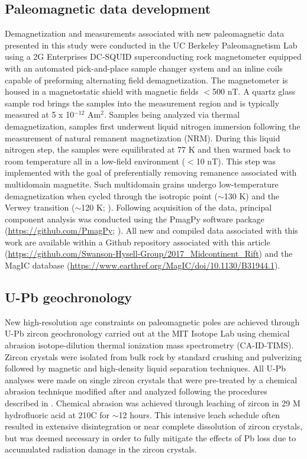 \documentclass[11pt,letterpaper]{article}
\begin{document}
\subsection{Paleomagnetic data development}

Demagnetization and measurements associated with new paleomagnetic data presented in this study were conducted in the UC Berkeley Paleomagnetism Lab using a 2G Enterprises DC-SQUID superconducting rock magnetometer equipped with an automated pick-and-place sample changer system and an inline coils capable of preforming alternating field demagnetization. The magnetometer is housed in a magnetostatic shield with magnetic fields $<$500 nT. A quartz glass sample rod brings the samples into the measurement region and is typically measured at 5 x 10$^{-12}$ Am$^2$. Samples being analyzed via thermal demagnetization, samples first underwent liquid nitrogen immersion following the measurement of natural remanent magnetization (NRM). During this liquid nitrogen step, the samples were equilibrated at 77 K and then warmed back to room temperature all in a low-field environment ($<$10 nT). This step was implemented with the goal of preferentially removing remanence associated with multidomain magnetite. Such multidomain grains undergo low-temperature demagnetization when cycled through the isotropic point ($\sim$130 K) and the Verwey transition ($\sim$120 K; \citealp{Verwey1939a, Feinberg2015a}). Following acquisition of the data, principal component analysis \citep{Kirschvink1980a} was conducted using the PmagPy software package (\url{https://github.com/PmagPy}; \citealp{Tauxe2016a}). All new and compiled data associated with this work are available within a Github repository associated with this article (\url{https://github.com/Swanson-Hysell-Group/2017_Midcontinent_Rift}) and the MagIC database (\url{https://www.earthref.org/MagIC/doi/10.1130/B31944.1}).

\subsection{U-Pb geochronology}

New high-resolution age constraints on paleomagnetic poles are achieved through U-Pb zircon geochronology carried out at the MIT Isotope Lab using chemical abrasion isotope-dilution thermal ionization mass spectrometry (CA-ID-TIMS). Zircon crystals were isolated from bulk rock by standard crushing and pulverizing followed by magnetic and high-density liquid separation techniques. All U-Pb analyses were made on single zircon crystals that were pre-treated by a chemical abrasion technique modified after \cite{Mattinson2005a} and analyzed following the procedures described in \cite{Ramezani2011a}. Chemical abrasion was achieved through leaching of zircon in 29 M hydrofluoric acid at 210\textdegree C for $\sim$12 hours. This intensive leach schedule often resulted in extensive disintegration or near complete dissolution of zircon crystals, but was deemed necessary in order to fully mitigate the effects of Pb loss due to accumulated radiation damage in the zircon crystals.
\end{document}
